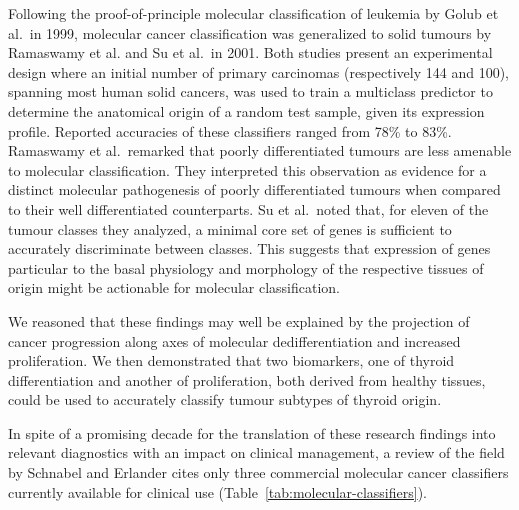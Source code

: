 Following the proof-of-principle molecular classification of leukemia by Golub
et al.~in 1999,\cite{golub_molecular_1999} molecular cancer classification was
generalized to solid tumours by Ramaswamy et al. and Su et al.~in
2001.\cite{ramaswamy_multiclass_2001,su_molecular_2001} Both studies present an
experimental design where an initial number of primary carcinomas (respectively
144 and 100), spanning most human solid cancers, was used to train a multiclass
predictor to determine the anatomical origin of a random test sample, given its
expression profile.  Reported accuracies of these classifiers ranged from 78\%
to 83\%.  Ramaswamy et al.~remarked that poorly differentiated tumours are less
amenable to molecular classification.  They interpreted this observation as
evidence for a distinct molecular pathogenesis of poorly differentiated tumours
when compared to their well differentiated counterparts.  Su et al.~noted that,
for eleven of the tumour classes they analyzed, a minimal core set of genes is
sufficient to accurately discriminate between classes.  This suggests that
expression of genes particular to the basal physiology and morphology of the
respective tissues of origin might be actionable for molecular classification.

We reasoned that these findings may well be explained by the projection of
cancer progression along axes of molecular dedifferentiation and increased
proliferation.  We then demonstrated that two biomarkers, one of thyroid
differentiation and another of proliferation, both derived from healthy tissues,
could be used to accurately classify tumour subtypes of thyroid
origin.\cite{tomas_general_2012}

In spite of a promising decade for the translation of these research findings
into relevant diagnostics with an impact on clinical management, a review of the
field by Schnabel and Erlander\cite{schnabel_gene_2012} cites only three
commercial molecular cancer classifiers currently available for clinical use
(Table~\ref{tab:molecular-classifiers}).


